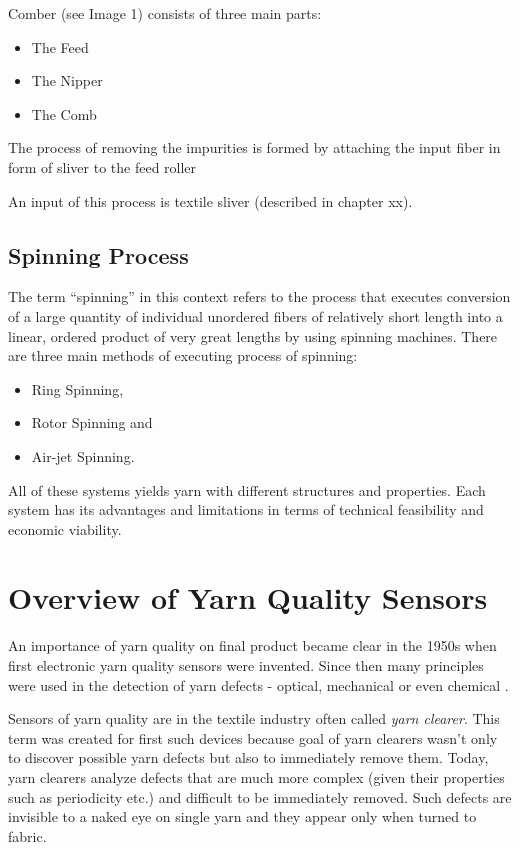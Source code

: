 \documentclass[twoside]{ctuthesis}
\theoremstyle{plain}
\theoremstyle{definition}
\theoremstyle{note}
\begin{document}
Comber (see Image 1) consists of three main parts: 
\begin{itemize}
	\setlength{\itemsep}{5pt}
\item The Feed

\item The Nipper

\item The Comb
\end{itemize}
The process of removing the impurities is formed by attaching the input fiber in form of sliver to the feed roller

An input of this process is textile sliver (described in chapter xx).
\subsection{Spinning Process}
\label{spinningProcesses}
The term “spinning” in this context refers to the process that executes conversion of a large quantity of individual unordered fibers of relatively short length into a linear, ordered product of very great lengths by using spinning machines. There are three main methods of executing process of spinning:
\begin{itemize}
	\setlength{\itemsep}{5pt}
\item Ring Spinning,

\item Rotor Spinning and

\item Air-jet Spinning.
\end{itemize}
All of these systems yields yarn with different structures and properties. Each system has its advantages and limitations in terms of technical feasibility and economic viability.
\section{Overview of Yarn Quality Sensors}
An importance of yarn quality on final product became clear in the 1950s when first electronic yarn quality sensors were invented. Since then many principles were used in the detection of yarn defects - optical, mechanical or even chemical \cite{cite:1}.

Sensors of yarn quality are in the textile industry often called \textit{yarn clearer}. This term was created for first such devices because goal of yarn clearers wasn't only to discover possible yarn defects but also to immediately remove them. Today, yarn clearers analyze defects that are much more complex (given their properties such as periodicity etc.) and difficult to be immediately removed. Such defects are invisible to a naked eye on single yarn and they appear only when turned to fabric.
\end{document}
